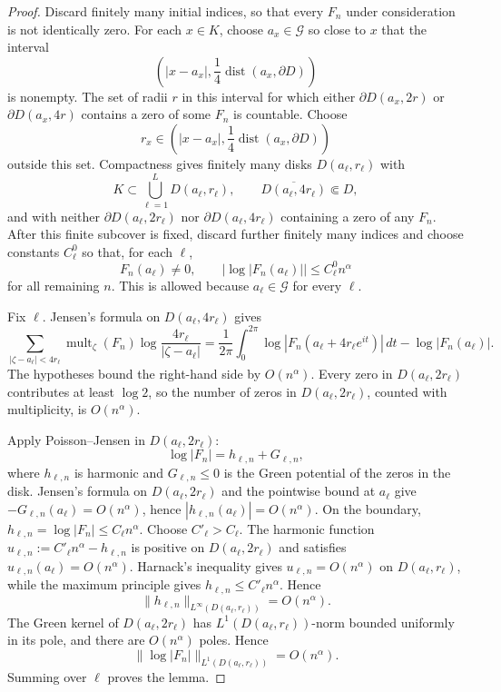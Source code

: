 \documentclass[reqno]{article}
\theoremstyle{definition}
\theoremstyle{remark}
\theoremstyle{plain}
\begin{document}
\begin{proof}
Discard finitely many initial indices, so that every $F_n$ under consideration is not identically zero. For each $x\in K$, choose $a_x\in\mathcal G$ so close to $x$ that the interval
$$\left(|x-a_x|,\frac14\operatorname{dist}(a_x,\partial D)\right)$$
is nonempty. The set of radii $r$ in this interval for which either $\partial D(a_x,2r)$ or $\partial D(a_x,4r)$ contains a zero of some $F_n$ is countable. Choose
$$r_x\in\left(|x-a_x|,\frac14\operatorname{dist}(a_x,\partial D)\right)$$
outside this set. Compactness gives finitely many disks $D(a_\ell,r_\ell)$ with
$$K\subset\bigcup_{\ell=1}^L D(a_\ell,r_\ell),\qquad
\overline{D(a_\ell,4r_\ell)}\Subset D,$$
and with neither $\partial D(a_\ell,2r_\ell)$ nor $\partial D(a_\ell,4r_\ell)$ containing a zero of any $F_n$.
After this finite subcover is fixed, discard further finitely many indices and choose constants $C_\ell^0$ so that, for each $\ell$,
$$
F_n(a_\ell)\ne0,
\qquad
|\log|F_n(a_\ell)||\le C_\ell^0 n^\alpha
$$
for all remaining $n$. This is allowed because $a_\ell\in\mathcal G$ for every $\ell$.

Fix $\ell$. Jensen's formula on $D(a_\ell,4r_\ell)$ gives
$$\sum_{|\zeta-a_\ell|<4r_\ell}\operatorname{mult}_\zeta(F_n)
\log\frac{4r_\ell}{|\zeta-a_\ell|}
=\frac1{2\pi}\int_0^{2\pi}\log|F_n(a_\ell+4r_\ell e^{it})|\,dt-\log|F_n(a_\ell)|.$$
The hypotheses bound the right-hand side by $O(n^\alpha)$. Every zero in $D(a_\ell,2r_\ell)$ contributes at least $\log2$, so the number of zeros in $D(a_\ell,2r_\ell)$, counted with multiplicity, is $O(n^\alpha)$.

Apply Poisson--Jensen in $D(a_\ell,2r_\ell)$:
$$\log|F_n|=h_{\ell,n}+G_{\ell,n},$$
where $h_{\ell,n}$ is harmonic and $G_{\ell,n}\le0$ is the Green potential of the zeros in the disk. Jensen's formula on $D(a_\ell,2r_\ell)$ and the pointwise bound at $a_\ell$ give $-G_{\ell,n}(a_\ell)=O(n^\alpha)$, hence $|h_{\ell,n}(a_\ell)|=O(n^\alpha)$. On the boundary, $h_{\ell,n}=\log|F_n|\le C_\ell n^\alpha$. Choose $C'_\ell>C_\ell$. The harmonic function $u_{\ell,n}:=C'_\ell n^\alpha-h_{\ell,n}$ is positive on $D(a_\ell,2r_\ell)$ and satisfies $u_{\ell,n}(a_\ell)=O(n^\alpha)$. Harnack's inequality gives $u_{\ell,n}=O(n^\alpha)$ on $D(a_\ell,r_\ell)$, while the maximum principle gives $h_{\ell,n}\le C'_\ell n^\alpha$. Hence
$$\|h_{\ell,n}\|_{L^\infty(D(a_\ell,r_\ell))}=O(n^\alpha).$$
The Green kernel of $D(a_\ell,2r_\ell)$ has $L^1(D(a_\ell,r_\ell))$-norm bounded uniformly in its pole, and there are $O(n^\alpha)$ poles. Hence
$$\|\log|F_n|\|_{L^1(D(a_\ell,r_\ell))}=O(n^\alpha).$$
Summing over $\ell$ proves the lemma.
\end{proof}
\end{document}
